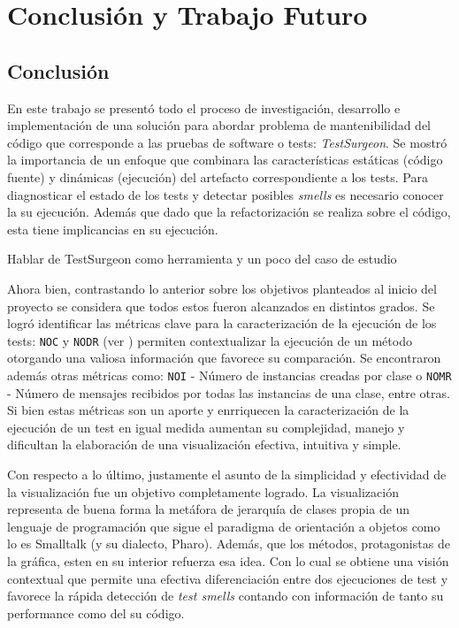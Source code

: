 \chapter{Conclusión y Trabajo Futuro}

\section{Conclusión}

\par En este trabajo se presentó todo el proceso de investigación, desarrollo e implementación de una solución para abordar problema de mantenibilidad del código que corresponde a las pruebas de software o tests: \emph{TestSurgeon}. Se mostró la importancia de un enfoque que combinara las características estáticas (código fuente) y dinámicas (ejecución) del artefacto correspondiente a los tests. Para diagnosticar el estado de los tests y detectar posibles \emph{smells} es necesario conocer la su ejecución. Además que dado que la refactorización se realiza sobre el código, esta tiene implicancias en su ejecución.

\par Hablar de TestSurgeon como herramienta y un poco del caso de estudio


\par Ahora bien, contrastando lo anterior sobre los objetivos planteados al inicio del proyecto se considera que todos estos fueron alcanzados en distintos grados. Se logró identificar las métricas clave para la caracterización de la ejecución de los tests: {\tt NOC} y {\tt NODR} (ver ) permiten contextualizar la ejecución de un método otorgando una valiosa información que favorece su comparación. Se encontraron además otras métricas como: {\tt NOI} - Número de instancias creadas por clase o {\tt NOMR} - Número de mensajes recibidos por todas las instancias de una clase, entre otras. Si bien estas métricas son un aporte y enrriquecen la caracterización de la ejecución de un test en igual medida aumentan su complejidad, manejo y dificultan la elaboración de una visualización efectiva, intuitiva y simple. 

\par Con respecto a lo último, justamente el asunto de la simplicidad y efectividad de la visualización fue un objetivo completamente logrado. La visualización representa de buena forma la metáfora de jerarquía de clases propia de un lenguaje de programación que sigue el paradigma de orientación a objetos como lo es Smalltalk (y su dialecto, Pharo). Además, que los métodos, protagonistas de la gráfica, esten en su interior refuerza esa idea. Con lo cual se obtiene una visión contextual que permite una efectiva diferenciación entre dos ejecuciones de test y favorece la rápida detección de \emph{test smells} contando con información de tanto su performance como del su código.

